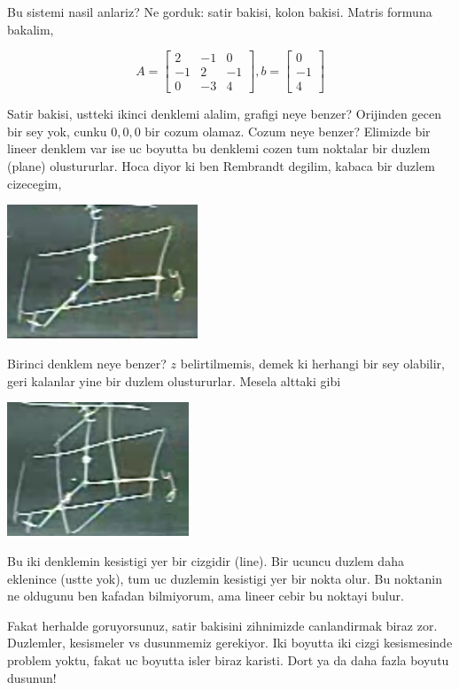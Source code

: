 \documentclass[12pt,fleqn]{article}\usepackage{../common}
\begin{document}
Bu sistemi nasil anlariz? Ne gorduk: satir bakisi, kolon bakisi. Matris
formuna bakalim, 

$$ A = 
\left[\begin{array}{rrr}
2 & -1 & 0 \\
-1 & 2 & -1 \\
0 & -3 & 4 
\end{array}\right]
,
b = 
\left[\begin{array}{r}
0  \\
-1 \\
4  
\end{array}\right]
 $$

Satir bakisi, ustteki ikinci denklemi alalim, grafigi neye benzer?
Orijinden gecen bir sey yok, cunku $0,0,0$ bir cozum olamaz. Cozum neye
benzer? Elimizde bir lineer denklem var ise uc boyutta bu denklemi cozen
tum noktalar bir duzlem (plane) olustururlar. Hoca diyor ki ben Rembrandt
degilim, kabaca bir duzlem cizecegim, 

\includegraphics[height=4cm]{1_06.png}

Birinci denklem neye benzer? $z$ belirtilmemis, demek ki herhangi bir sey
olabilir, geri kalanlar yine bir duzlem olustururlar. Mesela alttaki gibi

\includegraphics[height=4cm]{1_07.png}

Bu iki denklemin kesistigi yer bir cizgidir (line). Bir ucuncu duzlem daha
eklenince (ustte yok), tum uc duzlemin kesistigi yer bir nokta olur. Bu
noktanin ne oldugunu ben kafadan bilmiyorum, ama lineer cebir bu noktayi
bulur.

Fakat herhalde goruyorsunuz, satir bakisini zihnimizde canlandirmak biraz
zor. Duzlemler, kesismeler vs dusunmemiz gerekiyor. Iki boyutta iki cizgi
kesismesinde problem yoktu, fakat uc boyutta isler biraz karisti. Dort ya
da daha fazla boyutu dusunun! 
\end{document}
